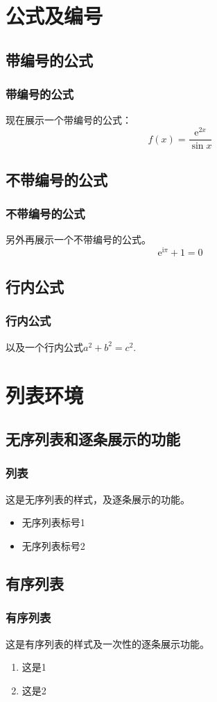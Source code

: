 \documentclass[aspectratio=169, 10pt, utf8, mathserif]{beamer}
\numberwithin{equation}{section} %
\numberwithin{figure}{section} %
\begin{document}
\section{公式及编号}
\subsection{带编号的公式}
\begin{frame}
	\frametitle{带编号的公式}
现在展示一个带编号的公式：
	\begin{equation}
	f(x) = \frac{\mathrm e^{2x}}{\sin x}
	\end{equation}
\end{frame}

\subsection{不带编号的公式}
\begin{frame}
	\frametitle{不带编号的公式}
	另外再展示一个不带编号的公式。
\[
\mathrm e^{\mathrm i \pi} + 1 = 0 
\]
\end{frame}

\subsection{行内公式}
\begin{frame}
	\frametitle{行内公式}
	以及一个行内公式$a^2 + b^2 = c^2$.
\end{frame}

\section{列表环境}
\subsection{无序列表和逐条展示的功能}
\begin{frame}
	\frametitle{列表}
这是无序列表的样式，及逐条展示的功能。
	\begin{itemize}
	\item 无序列表标号1
	\pause
	\item 无序列表标号2
	\end{itemize}
\end{frame}

\subsection{有序列表}
\begin{frame}
	\frametitle{有序列表}
这是有序列表的样式及一次性的逐条展示功能。
	\begin{enumerate}[<+-|alert@+>]
	\item 这是1
	\item 这是2
	\end{enumerate}
\end{frame}
\end{document}
